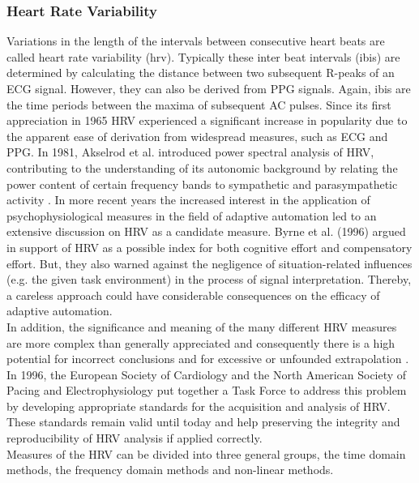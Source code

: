 \subsubsection{Heart Rate Variability}
Variations in the length of the intervals between consecutive heart beats are called heart rate variability (\gls{hrv}). Typically these inter beat intervals (\gls{ibi}s) are determined by calculating the distance between two subsequent R-peaks of an ECG signal. However, they can also be derived from PPG signals. Again, \gls{ibi}s are the time periods between the maxima of subsequent AC pulses. Since its first appreciation in 1965 HRV experienced a significant increase in popularity due to the apparent ease of derivation from widespread measures, such as ECG and PPG. In 1981, Akselrod et al. introduced power spectral analysis of HRV, contributing to the understanding of its autonomic background by relating the power content of certain frequency bands to sympathetic and parasympathetic activity \cite{TheEuropeanSocietyofCardiology1996}.
In more recent years the increased interest in the application of psychophysiological measures in the field of adaptive automation led to an extensive discussion on HRV as a candidate measure. Byrne et al. (1996) argued in support of HRV as a possible index for both cognitive effort and compensatory effort. But, they also warned against the negligence of situation-related influences (e.g. the given task environment) in the process of signal interpretation. Thereby, a careless approach could have considerable consequences on the efficacy of adaptive automation.\\
In addition, the significance and meaning of the many different HRV measures are more complex than generally appreciated and consequently there is a high potential for incorrect conclusions and for excessive or unfounded extrapolation \cite{TheEuropeanSocietyofCardiology1996}.
In 1996, the European Society of Cardiology and the North American Society of Pacing and Electrophysiology put together a Task Force to address this problem by developing appropriate standards for the acquisition and analysis of HRV.
These standards remain valid until today and help preserving the integrity and reproducibility of HRV analysis if applied correctly.\\
Measures of the HRV can be divided into three general groups, the time domain methods, the frequency domain methods and non-linear methods. 
